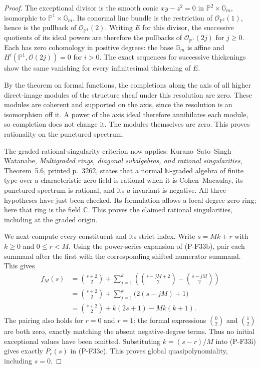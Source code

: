 \begin{proof}
The exceptional divisor is the smooth conic
$xy-z^2=0$ in $\mathbb P^2\times\mathbb G_m$,
isomorphic to $\mathbb P^1\times\mathbb G_m$.
Its conormal line bundle is the restriction of
$\mathcal O_{\mathbb P^2}(1)$, hence is
the pullback of $\mathcal O_{\mathbb P^1}(2)$.
Writing $E$ for this divisor, the successive
quotients of its ideal powers are therefore
the pullbacks of $\mathcal O_{\mathbb P^1}(2j)$
for $j\ge0$.
Each has zero cohomology in positive degrees:
the base $\mathbb G_m$ is affine and
$H^i(\mathbb P^1,\mathcal O(2j))=0$ for $i>0$.
The exact sequences for successive thickenings
show the same vanishing for every infinitesimal
thickening of $E$.

By the theorem on formal functions, the completions
along the axis of all higher direct-image modules
of the structure sheaf under this resolution are
zero. These modules are coherent and supported on
the axis, since the resolution is an isomorphism
off it. A power of the axis ideal therefore
annihilates each module, so completion does not
change it. The modules themselves are zero.
This proves rationality on the punctured spectrum.

The graded rational-singularity criterion now applies:
Kurano--Sato--Singh--Watanabe,
\emph{Multigraded rings, diagonal subalgebras, and
rational singularities}, Theorem~5.6, printed p.~3262,
states that a normal $\mathbb N$-graded algebra of
finite type over a characteristic-zero field is
rational when it is Cohen--Macaulay, its punctured
spectrum is rational, and its $a$-invariant is negative.
All three hypotheses have just been checked.
Its formulation allows a local degree-zero ring;
here that ring is the field $\mathbb C$.
This proves the claimed rational singularities,
including at the graded origin.

We next compute every constituent and its strict index.
Write $s=Mk+r$ with $k\ge0$ and $0\le r<M$.
Using the power-series expansion of (P-F33b),
pair each summand after the first with the
corresponding shifted numerator summand. This gives
\begin{align*}
 f_M(s)
 &=\binom{s+2}{2}
      +\sum_{j=1}^{k}
           \left(\binom{s-jM+2}{2}
                        -\binom{s-jM}{2}\right)\\
 &=\binom{s+2}{2}
      +\sum_{j=1}^{k}\bigl(2(s-jM)+1\bigr)\\
 &=\binom{s+2}{2}+k(2s+1)-Mk(k+1).
 \tag{P-F33i}
\end{align*}
The pairing also holds for $r=0$ and $r=1$:
the formal expressions $\binom02$ and $\binom12$
are both zero, exactly matching the absent
negative-degree terms. Thus no initial exceptional
values have been omitted.
Substituting $k=(s-r)/M$ into (P-F33i) gives
exactly $P_r(s)$ in (P-F33c).
This proves global quasipolynomiality, including $s=0$.


\end{proof}
